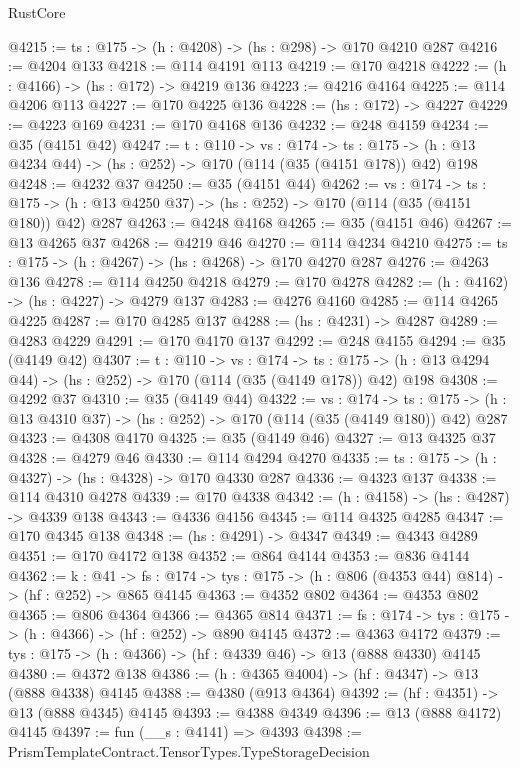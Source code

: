 \begin{lexlean}{RustCore}
\begin{coremodule}
@4215 := {ts : @175} -> (h : @4208) -> (hs : @298) -> @170 @4210 @287
@4216 := @4204 @133
@4218 := @114 @4191 @113
@4219 := @170 @4218
@4222 := (h : @4166) -> (hs : @172) -> @4219 @136
@4223 := @4216 @4164
@4225 := @114 @4206 @113
@4227 := @170 @4225 @136
@4228 := (hs : @172) -> @4227
@4229 := @4223 @169
@4231 := @170 @4168 @136
@4232 := @248 @4159
@4234 := @35 (@4151 @42)
@4247 := {t : @110} ->
  {vs : @174} ->
  {ts : @175} -> (h : @13 @4234 @44) -> (hs : @252) -> @170 (@114 (@35 (@4151 @178)) @42) @198
@4248 := @4232 @37
@4250 := @35 (@4151 @44)
@4262 := {vs : @174} ->
  {ts : @175} -> (h : @13 @4250 @37) -> (hs : @252) -> @170 (@114 (@35 (@4151 @180)) @42) @287
@4263 := @4248 @4168
@4265 := @35 (@4151 @46)
@4267 := @13 @4265 @37
@4268 := @4219 @46
@4270 := @114 @4234 @4210
@4275 := {ts : @175} -> (h : @4267) -> (hs : @4268) -> @170 @4270 @287
@4276 := @4263 @136
@4278 := @114 @4250 @4218
@4279 := @170 @4278
@4282 := (h : @4162) -> (hs : @4227) -> @4279 @137
@4283 := @4276 @4160
@4285 := @114 @4265 @4225
@4287 := @170 @4285 @137
@4288 := (hs : @4231) -> @4287
@4289 := @4283 @4229
@4291 := @170 @4170 @137
@4292 := @248 @4155
@4294 := @35 (@4149 @42)
@4307 := {t : @110} ->
  {vs : @174} ->
  {ts : @175} -> (h : @13 @4294 @44) -> (hs : @252) -> @170 (@114 (@35 (@4149 @178)) @42) @198
@4308 := @4292 @37
@4310 := @35 (@4149 @44)
@4322 := {vs : @174} ->
  {ts : @175} -> (h : @13 @4310 @37) -> (hs : @252) -> @170 (@114 (@35 (@4149 @180)) @42) @287
@4323 := @4308 @4170
@4325 := @35 (@4149 @46)
@4327 := @13 @4325 @37
@4328 := @4279 @46
@4330 := @114 @4294 @4270
@4335 := {ts : @175} -> (h : @4327) -> (hs : @4328) -> @170 @4330 @287
@4336 := @4323 @137
@4338 := @114 @4310 @4278
@4339 := @170 @4338
@4342 := (h : @4158) -> (hs : @4287) -> @4339 @138
@4343 := @4336 @4156
@4345 := @114 @4325 @4285
@4347 := @170 @4345 @138
@4348 := (hs : @4291) -> @4347
@4349 := @4343 @4289
@4351 := @170 @4172 @138
@4352 := @864 @4144
@4353 := @836 @4144
@4362 := {k : @41} ->
  {fs : @174} -> {tys : @175} -> (h : @806 (@4353 @44) @814) -> (hf : @252) -> @865 @4145
@4363 := @4352 @802
@4364 := @4353 @802
@4365 := @806 @4364
@4366 := @4365 @814
@4371 := {fs : @174} -> {tys : @175} -> (h : @4366) -> (hf : @252) -> @890 @4145
@4372 := @4363 @4172
@4379 := {tys : @175} -> (h : @4366) -> (hf : @4339 @46) -> @13 (@888 @4330) @4145
@4380 := @4372 @138
@4386 := (h : @4365 @4004) -> (hf : @4347) -> @13 (@888 @4338) @4145
@4388 := @4380 (@913 @4364)
@4392 := (hf : @4351) -> @13 (@888 @4345) @4145
@4393 := @4388 @4349
@4396 := @13 (@888 @4172) @4145
@4397 := fun (__s : @4141) => @4393
@4398 := PrismTemplateContract.TensorTypes.TypeStorageDecision

\end{coremodule}
\end{lexlean}
